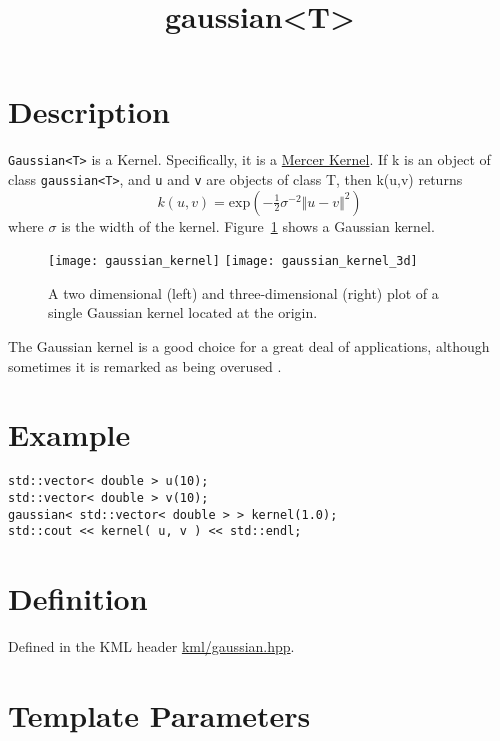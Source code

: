 \documentclass{article}
\newcommand{\half}{\tfrac{1}{2}}
\begin{document}
\title{gaussian<T>}
\maketitle

\section*{Description}

\texttt{Gaussian<T>} is a Kernel. Specifically, it is a \href{\kmlroot/reference/mercer_kernel.html}{Mercer Kernel}. If k is an object of class \texttt{gaussian<T>}, and \texttt{u} and \texttt{v} are objects of class T, then k(u,v) returns
%
%
%
\[k(u,v) = \textrm{exp}( - \half \sigma^{-2} \Vert u-v \Vert^2 )\]
%
where $\sigma$ is the width of the kernel. Figure~\ref{figure:gaussian_kernel} shows a Gaussian kernel.

\begin{figure}
\texttt{[image: gaussian\_kernel]}
\texttt{[image: gaussian\_kernel\_3d]}
\caption{A two dimensional (left) and three-dimensional (right) plot of a single Gaussian kernel located at the origin.}
\label{figure:gaussian_kernel}
\end{figure}

The Gaussian kernel is a good choice for a great deal of applications, although sometimes it is remarked as being
overused \cite{scholkopf02learning}.


\section*{Example}


\highlightcpp{}
\begin{verbatim}
std::vector< double > u(10);
std::vector< double > v(10);
gaussian< std::vector< double > > kernel(1.0);
std::cout << kernel( u, v ) << std::endl;
\end{verbatim}


\section*{Definition}

Defined in the KML header \href{\kmlsvnroot/kml/gaussian.hpp}{kml/gaussian.hpp}.


\section*{Template Parameters}
\end{document}
